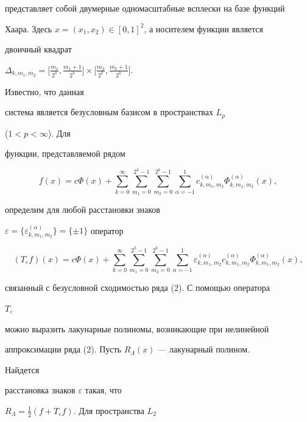 представляет собой двумерные одномасштабные всплески на базе функций 


Хаара. Здесь $x=(x_1,x_2)\in[0,1]^2$, а носителем функции является 


двоичный квадрат 


$\Delta_{k,m_1,m_2}=\big[\frac{m_1}{2^k},\frac{m_1+1}{2^k}\big] 


\times\big[\frac{m_2}{2^k},\frac{m_2+1}{2^k}\big]$. 


Известно, что данная 


система является безусловным базисом в пространствах $L_p$ 


($1<p<\infty$). Для 


функции, представляемой рядом 


\begin{equation} 


f(x)=c\Phi(x)+\sum^\infty_{k=0}\sum^{2^k-1}_{m_1=0} 


\sum^{2^k-1}_{m_2=0}\sum^1_{\alpha=-1} 


c^{(\alpha)}_{k,m_1,m_2}\Phi^{(\alpha)}_{k,m_1,m_2}(x), 


\end{equation} 


определим для любой расстановки знаков 


$\varepsilon=\{\varepsilon^{(\alpha)}_{k,m_1,m_2}\}=\{\pm1\}$ оператор 


\begin{equation} 


(T_\varepsilon f)(x)=c\Phi(x)+ 


\sum^\infty_{k=0}\sum^{2^k-1}_{m_1=0} 


\sum^{2^k-1}_{m_2=0}\sum^1_{\alpha=-1} 


\varepsilon^{(\alpha)}_{k,m_1,m_2} 


c^{(\alpha)}_{k,m_1,m_2}\Phi^{(\alpha)}_{k,m_1,m_2}(x), 


\end{equation} 


связанный с безусловной сходимостью ряда (2). С помощью оператора 


$T_\varepsilon$ 


можно выразить лакунарные полиномы, возникающие при нелинейной 


аппроксимации ряда (2). Пусть $R_\Lambda(x)$ --- лакунарный полином. 


Найдется 


расстановка знаков $\varepsilon$ такая, что 


$R_\Lambda=\frac{1}{2}(f+T_\varepsilon f)$. Для пространства $L_2$ 


